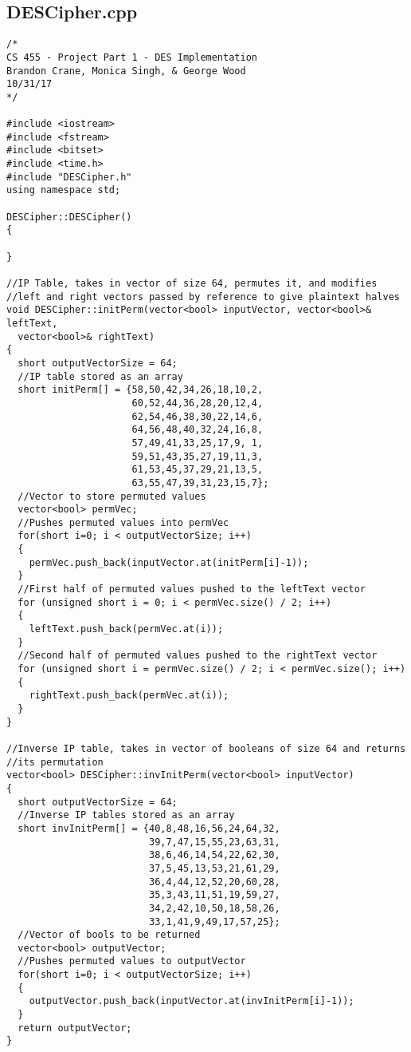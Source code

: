 \documentclass[11pt]{article}
\begin{document}
\subsection{DESCipher.cpp}
\begin{verbatim}
/*
CS 455 - Project Part 1 - DES Implementation
Brandon Crane, Monica Singh, & George Wood
10/31/17
*/

#include <iostream>
#include <fstream>
#include <bitset>
#include <time.h>
#include "DESCipher.h"
using namespace std;

DESCipher::DESCipher()
{

}

//IP Table, takes in vector of size 64, permutes it, and modifies
//left and right vectors passed by reference to give plaintext halves
void DESCipher::initPerm(vector<bool> inputVector, vector<bool>& leftText,
  vector<bool>& rightText)
{
  short outputVectorSize = 64;
  //IP table stored as an array
  short initPerm[] = {58,50,42,34,26,18,10,2,
                      60,52,44,36,28,20,12,4,
                      62,54,46,38,30,22,14,6,
                      64,56,48,40,32,24,16,8,
                      57,49,41,33,25,17,9, 1,
                      59,51,43,35,27,19,11,3,
                      61,53,45,37,29,21,13,5,
                      63,55,47,39,31,23,15,7};
  //Vector to store permuted values
  vector<bool> permVec;
  //Pushes permuted values into permVec
  for(short i=0; i < outputVectorSize; i++)
  {
    permVec.push_back(inputVector.at(initPerm[i]-1));
  }
  //First half of permuted values pushed to the leftText vector
  for (unsigned short i = 0; i < permVec.size() / 2; i++)
  {
    leftText.push_back(permVec.at(i));
  }
  //Second half of permuted values pushed to the rightText vector
  for (unsigned short i = permVec.size() / 2; i < permVec.size(); i++)
  {
    rightText.push_back(permVec.at(i));
  }
}

//Inverse IP table, takes in vector of booleans of size 64 and returns
//its permutation
vector<bool> DESCipher::invInitPerm(vector<bool> inputVector)
{
  short outputVectorSize = 64;
  //Inverse IP tables stored as an array
  short invInitPerm[] = {40,8,48,16,56,24,64,32,
                         39,7,47,15,55,23,63,31,
                         38,6,46,14,54,22,62,30,
                         37,5,45,13,53,21,61,29,
                         36,4,44,12,52,20,60,28,
                         35,3,43,11,51,19,59,27,
                         34,2,42,10,50,18,58,26,
                         33,1,41,9,49,17,57,25};
  //Vector of bools to be returned
  vector<bool> outputVector;
  //Pushes permuted values to outputVector
  for(short i=0; i < outputVectorSize; i++)
  {
    outputVector.push_back(inputVector.at(invInitPerm[i]-1));
  }
  return outputVector;
}


\end{verbatim}
\end{document}

